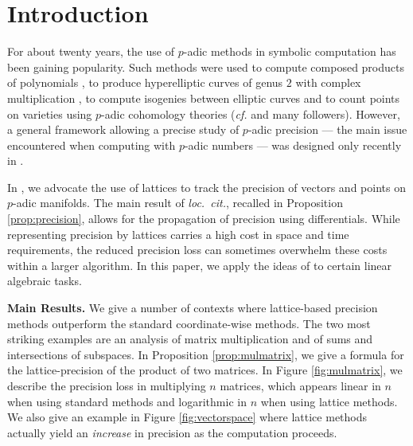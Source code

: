 \documentclass{sig-alternate}
\begin{document}
\section{Introduction}

For about twenty years, the use of $p$-adic methods in symbolic 
computation has been gaining popularity. Such methods were 
used to compute composed products of polynomials 
\cite{boston-gonzalez-perdry-schost:05a}, 
to produce hyperelliptic curves of genus $2$ with complex multiplication 
\cite{gaudry-houtmann-weng-ritzenthaler-kohel:06a},
to compute isogenies between elliptic curves \cite{lercier-sirvent:08a} 
and to count points on varieties using $p$-adic 
cohomology theories (\emph{cf.} \cite{kedlaya:01a,lauder:04a} and many
followers).
However, a general framework allowing a precise study of $p$-adic 
precision --- the main issue encountered when computing 
with $p$-adic numbers --- was designed only recently in 
\cite{caruso-roe-vaccon:14a}. 

In \cite{caruso-roe-vaccon:14a}, we advocate the use of lattices
to track the precision of vectors and points on $p$-adic manifolds.
The main result of \emph{loc.~cit.}, recalled in Proposition \ref{prop:precision},
allows for the propagation of precision using differentials.  While
representing precision by lattices carries a high
cost in space and time requirements, the reduced precision loss
can sometimes overwhelm these costs within a larger algorithm.
In this paper, we apply the ideas of \cite{caruso-roe-vaccon:14a} to
certain linear algebraic tasks.

\smallskip

\noindent
{\bf Main Results.}
We give a number of contexts where lattice-based precision methods
outperform the standard coordinate-wise methods.  The two most striking
examples are an analysis of matrix multiplication and of 
sums and intersections of subspaces.  In Proposition \ref{prop:mulmatrix},
we give a formula for the lattice-precision of the product of two matrices.
In Figure \ref{fig:mulmatrix}, we describe the precision loss in multiplying
$n$ matrices, which appears linear in $n$ when using standard methods
and logarithmic in $n$ when using lattice methods.  We also give an
example in Figure \ref{fig:vectorspace} where lattice methods
actually yield an \emph{increase} in precision as the computation
proceeds.
\end{document}
